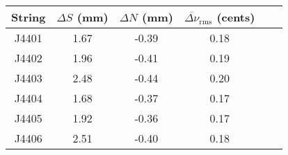 \begin{tabular}{cccccc}
\toprule
String & $\Delta S$ (mm) & $\Delta N$ (mm) & $\overline{\Delta \nu}_\text{rms}$ (cents) \\
\midrule
J4401 & 1.67 & -0.39 & 0.18 \\
J4402 & 1.96 & -0.41 & 0.19 \\
J4403 & 2.48 & -0.44 & 0.20 \\
J4404 & 1.68 & -0.37 & 0.17 \\
J4405 & 1.92 & -0.36 & 0.17 \\
J4406 & 2.51 & -0.40 & 0.18 \\
\bottomrule
\end{tabular}

